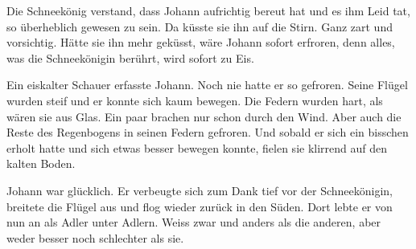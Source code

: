 Die Schneekönig verstand, dass Johann aufrichtig bereut hat und es ihm Leid tat, so überheblich gewesen zu sein. Da küsste sie ihn auf die Stirn. Ganz zart und vorsichtig. Hätte sie ihn mehr geküsst, wäre Johann sofort erfroren, denn alles, was die Schneekönigin berührt, wird sofort zu Eis. 

Ein eiskalter Schauer erfasste Johann. Noch nie hatte er so gefroren. Seine Flügel wurden steif und er konnte sich kaum bewegen. Die Federn wurden hart, als wären sie aus Glas. Ein paar brachen nur schon durch den Wind. Aber auch die Reste des Regenbogens in seinen Federn gefroren. Und sobald er sich ein bisschen erholt hatte und sich etwas besser bewegen konnte, fielen sie klirrend auf den kalten Boden.

Johann war glücklich. Er verbeugte sich zum Dank tief vor der Schneekönigin, breitete die Flügel aus und flog wieder zurück in den Süden. Dort lebte er von nun an als Adler unter Adlern. Weiss zwar und anders als die anderen, aber weder besser noch schlechter als sie. \hfill {\color{DeepPink}\decofourleft}
